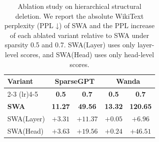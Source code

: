 \begin{table}[t]
\centering
\small
\setlength{\tabcolsep}{6pt}
\caption{ \small Ablation study on hierarchical structural deletion. We report the absolute WikiText perplexity (PPL ↓) of SWA and the PPL increase of each ablated variant relative to SWA under sparsity 0.5 and 0.7. SWA(Layer) uses only layer-level scores, and SWA(Head) uses only head-level scores.}
\label{tab:ablation_hier}
\begin{tabular}{lcccc}
\toprule
\multirow{2}{*}{\textbf{Variant}} 
& \multicolumn{2}{c}{\textbf{SparseGPT}} 
& \multicolumn{2}{c}{\textbf{Wanda}} \\
\cmidrule(lr){2-3} \cmidrule(lr){4-5}
& \textbf{0.5} & \textbf{0.7} 
& \textbf{0.5} & \textbf{0.7} \\
\midrule
\textbf{SWA} 
& \textbf{11.27} & \textbf{49.56} 
& \textbf{13.32} & \textbf{120.65} \\
SWA(Layer) 
& $+3.31$ & $+11.37$ 
& $+0.05$ & $+6.96$ \\
SWA(Head) 
& $+3.63$ & $+19.56$ 
& $+0.24$ & $+46.51$ \\
\bottomrule
\end{tabular}
\vspace{-0.5cm}
\end{table}
